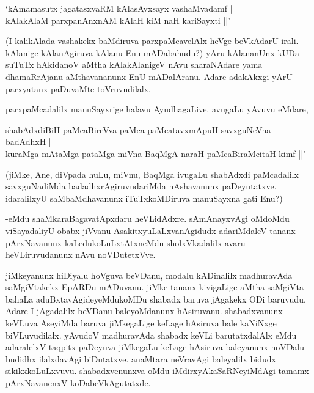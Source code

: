 \begin{shloka}
`kAmamasutx jagatasxvaRM kAlasAyxsayx vashaMvadamf |\\
kAlakAlaM parxpanAnxnAM kAlaH kiM naH kariSayxti ||'
\end{shloka}

(I kalikAlada vashakekx baMdiruva parxpaMcavelAlx heVge beVkAdarU irali. kAlanige kAlanAgiruva kAlanu Enu mADabahudu?) yAru kAlananUnx kUDa suTuTx hAkidanoV aMtha kAlakAlanigeV nAvu sharaNAdare yama dhamaRrAjanu aMthavananunx EnU mADalAranu. Adare adakAkxgi yArU parxyatanx paDuvaMte toVruvudilalx.

parxpaMcadalilx manuSayxrige halavu AyudhagaLive. avugaLu yAvuvu eMdare,

\begin{shloka}
shabAdxdiBiH paMcaBireVva paMca paMcatavxmApuH savxguNeVna badAdhxH |\\
kuraMga-mAtaMga-pataMga-miVna-BaqMgA naraH paMcaBiraMcitaH kimf ||'
\end{shloka}

(jiMke, Ane, diVpada huLu, miVnu, BaqMga ivugaLu shabAdxdi paMcadalilx savxguNadiMda badadhxrAgiruvudariMda nAshavanunx paDeyutatxve. idaralilxyU saMbaMdhavanunx iTuTxkoMDiruva manuSayxna gati Enu?)

-eMdu shaMkaraBagavatApxdaru heVLidAdxre. sAmAnayxvAgi oMdoMdu viSayadaliyU obabx jiVvanu AsakitxyuLaLxvanAgidudx adariMdaleV tananx pArxNavanunx kaLedukoLuLxtAtxneMdu sholxVkadalilx avaru heVLiruvudanunx nAvu noVDutetxVve.

jiMkeyanunx hiDiyalu hoVguva beVDanu, modalu kADinalilx madhuravAda saMgiVtakekx EpARDu mADuvanu. jiMke tananx kivigaLige aMtha saMgiVta bahaLa aduBxtavAgideyeMdukoMDu shabadx baruva jAgakekx ODi baruvudu. Adare I jAgadalilx beVDanu baleyoMdanunx hAsiruvanu. shabadxvanunx keVLuva AseyiMda baruva jiMkegaLige keLage hAsiruva bale kaNiNxge biVLuvudilalx. yAvudoV madhuravAda shabadx keVLi barutatxdalAlx eMdu adaralelxV taqpitx paDeyuva jiMkegaLu keLage hAsiruva baleyanunx noVDalu budidhx ilalxdavAgi biDutatxve. anaMtara neVravAgi baleyalilx bidudx sikikxkoLuLxvuvu. shabadxvenunxva oMdu iMdirxyAkaSaRNeyiMdAgi tamamx pArxNavanenxV koDabeVkAgutatxde.

